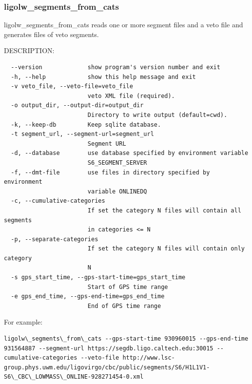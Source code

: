 \subsubsection{ligolw\_segments\_from\_cats}
ligolw\_segments\_from\_cats reads one or more segment files and a veto file and generates files of veto segments.

DESCRIPTION:
\begin{verbatim}
  --version             show program's version number and exit
  -h, --help            show this help message and exit
  -v veto_file, --veto-file=veto_file
                        veto XML file (required).
  -o output_dir, --output-dir=output_dir
                        Directory to write output (default=cwd).
  -k, --keep-db         Keep sqlite database.
  -t segment_url, --segment-url=segment_url
                        Segment URL
  -d, --database        use database specified by environment variable
                        S6_SEGMENT_SERVER
  -f, --dmt-file        use files in directory specified by environment
                        variable ONLINEDQ
  -c, --cumulative-categories
                        If set the category N files will contain all segments
                        in categories <= N
  -p, --separate-categories
                        If set the category N files will contain only category
                        N
  -s gps_start_time, --gps-start-time=gps_start_time
                        Start of GPS time range
  -e gps_end_time, --gps-end-time=gps_end_time
                        End of GPS time range
\end{verbatim}


For example:
\begin{verbatim}
ligolw\_segments\_from\_cats --gps-start-time 930960015 --gps-end-time 931564887 --segment-url https://segdb.ligo.caltech.edu:30015 --cumulative-categories --veto-file http://www.lsc-group.phys.uwm.edu/ligovirgo/cbc/public/segments/S6/H1L1V1-S6\_CBC\_LOWMASS\_ONLINE-928271454-0.xml
\end{verbatim}




